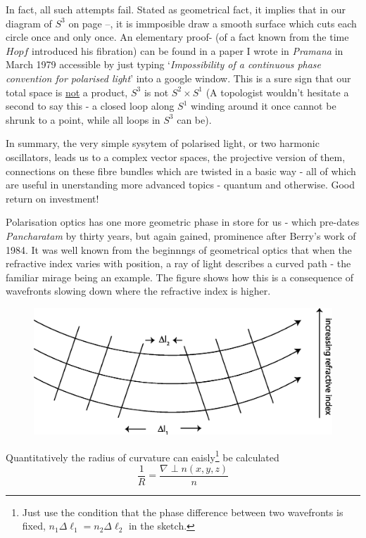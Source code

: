 In fact, all such attempts fail. Stated as geometrical fact, it implies that
in our diagram of $S^3$ on page --, it is immposible draw a smooth surface which
cuts each circle once and only once. An elementary proof- (of a fact known
from the time $Hopf$ introduced his fibration) can be found in a paper I wrote in
\textit{Pramana} in March 1979 accessible by just typing `\textit{Impossibility of a continuous
phase convention for polarised light}' into a google window. This is a sure sign
that our total space is \underline{not} a product, $S^3$ is not $S^2 \times S^1$ (A topologist wouldn't
hesitate a second to say this - a closed loop along $S^1$ winding around it once
cannot be shrunk to a point, while all loops in $S^3$ can be).

In summary, the very simple sysytem of polarised light, or two harmonic
oscillators, leads us to a complex vector spaces, the projective version of them,
connections on these fibre bundles which are twisted in a basic way - all of which
are useful in unerstanding more advanced topics - quantum and otherwise. Good
return on investment!

Polarisation optics has one more geometric phase in store for us - which pre-dates \textit{Pancharatam} by thirty years, but again gained, prominence after Berry's work of 1984. It was well known from the beginnngs of geometrical optics that
when the refractive index varies with position, a ray of light describes a curved
path - the familiar mirage being an example. The figure shows how this is a consequence of
wavefronts slowing down where the refractive index is higher.
\begin{figure}[H]
\centering
\includegraphics[scale=0.16]{src/images/chap26/19.jpg}
\end{figure}

Quantitatively the radius of curvature can eaisly\footnote{Just use the condition that the phase difference between two wavefronts is fixed, $n_1 \Delta \ell_1 = n_2 \Delta \ell_2$ in the sketch.} be calculated
$$
\frac{1}{R} = \frac{\nabla \perp n (x,y,z)}{n}
$$

